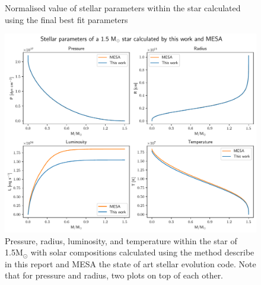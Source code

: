 \documentclass[twocolumn]{aastex631}
\begin{document}
\begin{figure}[ht!]
	\caption{Normalised value of stellar parameters within the star calculated using the final best fit parameters}
	\label{fig:main_4plots_normalised}
\end{figure}

\begin{figure}
	\centering
	\includegraphics[scale=0.66]{figures/4plots_mesa.pdf}
	\caption{Pressure, radius, luminosity, and temperature within the star of 1.5M$_\odot$ with solar compositions calculated using the method describe in this report and MESA the state of art stellar evolution code. Note that for pressure and radius, two plots on top of each other.}
	\label{fig:main_4plots_mesa}
\end{figure}
\end{document}
